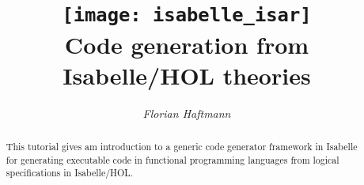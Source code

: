\documentclass[12pt,a4paper,fleqn]{report}
\title{\texttt{[image: isabelle\_isar]}
  \\[4ex] Code generation from Isabelle/HOL theories}
\author{\emph{Florian Haftmann}}
\begin{document}
\maketitle

\begin{abstract}
  This tutorial gives am introduction to a generic code generator framework in Isabelle
  for generating executable code in functional programming languages from logical
  specifications in Isabelle/HOL.
\end{abstract}

\thispagestyle{empty}\clearpage

\clearfirst


% 
% 
% 
% 
% 

\begingroup
 \small\raggedright\frenchspacing

\endgroup
\end{document}

